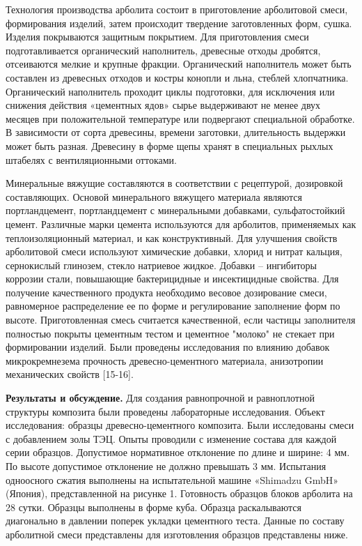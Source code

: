 \begin{multicols}{2}
Технология производства арболита состоит в приготовление арболитовой
смеси, формирования изделий, затем происходит твердение заготовленных
форм, сушка. Изделия покрываются защитным покрытием. Для приготовления
смеси подготавливается органический наполнитель, древесные отходы
дробятся, отсеиваются мелкие и крупные фракции. Органический наполнитель
может быть составлен из древесных отходов и костры конопли и льна,
стеблей хлопчатника. Органический наполнитель проходит циклы подготовки,
для исключения или снижения действия «цементных ядов» сырье выдерживают
не менее двух месяцев при положительной температуре или подвергают
специальной обработке. В зависимости от сорта древесины, времени
заготовки, длительность выдержки может быть разная. Древесину в форме
щепы хранят в специальных рыхлых штабелях с вентиляционными оттоками.

Минеральные вяжущие составляются в соответствии с рецептурой, дозировкой
составляющих. Основой минерального вяжущего материала являются
портландцемент, портландцемент с минеральными добавками, сульфатостойкий
цемент. Различные марки цемента используются для арболитов, применяемых
как теплоизоляционный материал, и как конструктивный. Для улучшения
свойств арболитовой смеси используют химические добавки, хлорид и нитрат
кальция, сернокислый глинозем, стекло натриевое жидкое. Добавки --
ингибиторы коррозии стали, повышающие бактерицидные и инсектицидные
свойства. Для получение качественного продукта необходимо весовое
дозирование смеси, равномерное распределение ее по форме и регулирование
заполнение форм по высоте. Приготовленная смесь считается качественной,
если частицы заполнителя полностью покрыты цементным тестом и цементное
"молоко" не стекает при формировании изделий. Были проведены
исследования по влиянию добавок микрокремнезема прочность
древесно-цементного материала, анизотропии механических свойств
{[}15-16{]}.

{\bfseries Результаты и обсуждение.} Для создания равнопрочной и
равноплотной структуры композита были проведены лабораторные
исследования. Объект исследования: образцы древесно-цементного
композита. Были исследованы смеси с добавлением золы ТЭЦ. Опыты
проводили с изменение состава для каждой серии образцов. Допустимое
нормативное отклонение по длине и ширине: 4 мм. По высоте допустимое
отклонение не должно превышать 3 мм. Испытания одноосного сжатия
выполнены на испытательной машине «Shimadzu GmbH» (Япония),
представленной на рисунке 1. Готовность образцов блоков арболита на 28
сутки. Образцы выполнены в форме куба. Образца раскалываются диагонально
в давлении поперек укладки цементного теста. Данные по составу
арболитной смеси представлены для изготовления образцов представлены
ниже.
\end{multicols}

